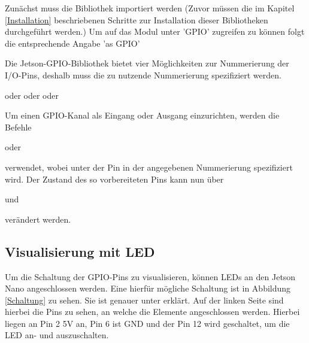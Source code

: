 Zunächst muss die Bibliothek importiert werden (Zuvor müssen die im Kapitel \ref{Installation} beschriebenen Schritte zur Installation dieser Bibliotheken durchgeführt werden.) Um auf das Modul unter 'GPIO' zugreifen zu können folgt die entsprechende Angabe 'as GPIO'

\medskip
{}
\medskip

Die Jetson-GPIO-Bibliothek bietet vier Möglichkeiten zur Nummerierung der I/O-Pins, deshalb muss die zu nutzende Nummerierung spezifiziert werden.

\medskip
{} \newline
oder \newline
{} \newline
oder \newline
{} \newline
oder \newline
{}
\medskip

Um einen GPIO-Kanal als Eingang oder Ausgang einzurichten, werden die Befehle

\medskip
{} \newline
oder \newline
{} \newline
\medskip

verwendet, wobei unter  der Pin in der angegebenen Nummerierung spezifiziert wird. Der Zustand des so vorbereiteten Pins kann nun über

\medskip
{}\newline
und \newline
{}
\medskip

verändert werden.

\subsection{Visualisierung mit LED}\label{LED}

Um die Schaltung der GPIO-Pins zu visualisieren, können LEDs an den Jetson Nano angeschlossen werden. Eine hierfür mögliche Schaltung ist in Abbildung \ref{Schaltung} zu sehen. Sie ist genauer unter \cite{JetsonHacks:2020} erklärt. Auf der linken Seite sind hierbei die Pins zu sehen, an welche die Elemente angeschlossen werden. Hierbei liegen an Pin 2 5V an, Pin 6 ist GND und der Pin 12 wird geschaltet, um die LED an- und auszuschalten.\\

